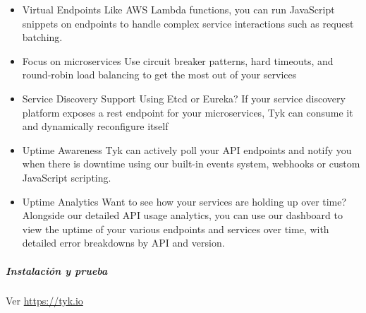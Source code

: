 \begin{itemize}
  \item Virtual Endpoints Like AWS Lambda functions, you can run JavaScript snippets on endpoints to handle complex service interactions such as request batching.
  \item Focus on microservices Use circuit breaker patterns, hard timeouts, and round-robin load balancing to get the most out of your services
  \item Service Discovery Support Using Etcd or Eureka? If your service discovery platform exposes a rest endpoint for your microservices, Tyk can consume it and dynamically reconfigure itself
  \item Uptime Awareness Tyk can actively poll your API endpoints and notify you when there is downtime using our built-in events system, webhooks or custom JavaScript scripting.
  \item Uptime Analytics Want to see how your services are holding up over time? Alongside our detailed API usage analytics, you can use our dashboard to view the uptime of your various endpoints and services over time, with detailed error breakdowns by API and version.
\end{itemize}

\subparagraph{Instalación y prueba}

Ver \url{https://tyk.io}
